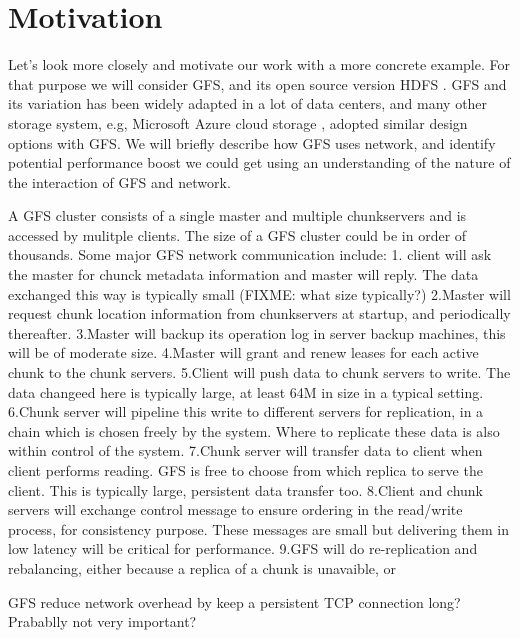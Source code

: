 \section{Motivation}
\label{section:motivation}

Let's look more closely and motivate our work with a more concrete example. For that purpose we will consider GFS, and its open source version HDFS \cite{hdfs}. GFS and its variation has been widely adapted in a lot of data centers, and many other storage system, e.g, Microsoft Azure cloud storage \cite{azure-storage}, adopted similar design options with GFS. We will briefly describe how GFS uses network, and identify potential performance boost we could get using an understanding of the nature of the interaction of GFS and network.

A GFS cluster consists of a single master and multiple chunkservers and is accessed by mulitple clients. The size of a GFS cluster could be in order of thousands. Some major GFS network communication include:
1. client will ask the master for chunck metadata information and master will reply. The data exchanged this way is typically small (FIXME: what size typically?)
2.Master will request chunk location information from chunkservers at startup, and periodically thereafter.
3.Master will backup its operation log in server backup machines, this will be of moderate size.
4.Master will grant and renew leases for each active chunk to the chunk servers.
5.Client will push data to chunk servers to write. The data changeed here is typically large, at least 64M in size in a typical setting.
6.Chunk server will pipeline this write to different servers for replication, in a chain which is chosen freely by the system. Where to replicate these data is also within control of the system.
7.Chunk server will transfer data to client when client performs reading. GFS is free to choose from which replica to serve the client. This is typically large, persistent data transfer too.
8.Client and chunk servers will exchange control message to ensure ordering in the read/write process, for consistency purpose. These messages are small but delivering them in low latency will be critical for performance.
9.GFS will do re-replication and rebalancing, either because a replica of a chunk is unavaible, or




GFS reduce network overhead by keep a persistent TCP connection long? Prabablly not very important?
